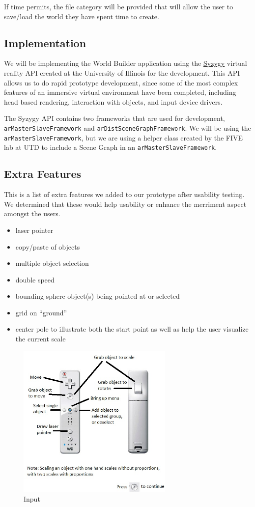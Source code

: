 If time permits, the file category will be provided that will allow the user to save/load the world they have spent time to create.

\subsection{Implementation}
We will be implementing the World Builder application using the \href{http://syzygy.isl.uiuc.edu/szg/szgsrc/doc/index.html}{Syzygy} virtual reality API created at the University of Illinois for the development.
This API allows us to do rapid prototype development, since some of the most complex features of an immersive virtual environment have been completed, including head based rendering, interaction with objects, and input device drivers.

The Syzygy API contains two frameworks that are used for development, \verb|arMasterSlaveFramework| and \verb|arDistSceneGraphFramework|.
We will be using the \verb|arMasterSlaveFramework|, but we are using a helper class created by the FIVE lab at UTD to include a Scene Graph in an \verb|arMasterSlaveFramework|.

\subsection{Extra Features}
This is a list of extra features we added to our prototype after usability testing. We determined that these would help usability or enhance the merriment aspect amongst the users.

\begin{itemize}
    \item laser pointer
    \item copy/paste of objects
    \item multiple object selection
    \item double speed
    \item bounding sphere object(s) being pointed at or selected
    \item grid on ``ground''
    \item center pole to illustrate both the start point as well as help the user visualize the current scale
\end{itemize}

\begin{figure}[htbp]
	\centering
	\includegraphics[width=3in]{figs/help.jpg}
	\caption{Input}
	\label{fig:help}
\end{figure}
